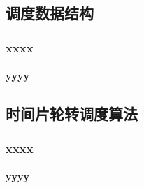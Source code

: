 % 
% 
\subsection{调度数据结构} %
\begin{frame}[fragile]
    \frametitle{xxxx}
    \framesubtitle{yyyy}
\end{frame}

% 
% 
% 
% 
% 
% 
% 
% 
\subsection{时间片轮转调度算法} %
\begin{frame}[fragile]
    \frametitle{xxxx}
    \framesubtitle{yyyy}
\end{frame}

